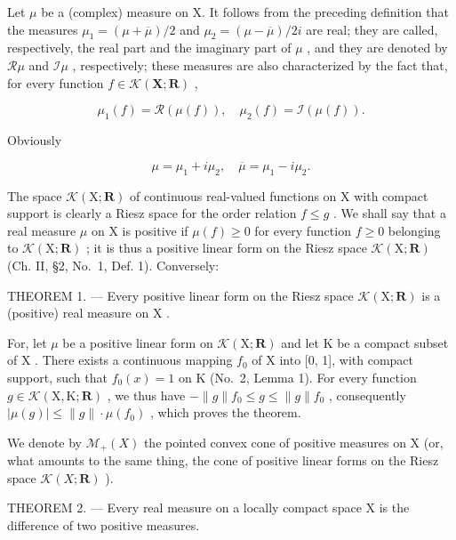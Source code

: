 Let \(\mu\) be a (complex) measure on X. It follows from the preceding definition that the measures \(\mu_{1} = (\mu +\overline{\mu}) / 2\) and \(\mu_{2} = (\mu -\overline{\mu}) / 2i\) are real; they are called, respectively, the real part and the imaginary part of \(\mu\) , and they are denoted by \(\mathcal{R}\mu\) and \(\mathcal{I}\mu\) , respectively; these measures are also characterized by the fact that, for every function \(f\in \mathcal{K}(\mathbf{X};\mathbf{R})\) ,

\[
\mu_ {1} (f) = \mathcal {R} (\mu (f)), \quad \mu_ {2} (f) = \mathcal {I} (\mu (f)).
\]

Obviously

\[
\mu = \mu_ {1} + i \mu_ {2}, \quad \overline {{{{\mu}}}} = \mu_ {1} - i \mu_ {2}.
\]

The space \(\mathcal{K}(\mathrm{X};\mathbf{R})\) of continuous real-valued functions on \(\mathrm{X}\) with compact support is clearly a Riesz space for the order relation \(f\leqslant g\) . We shall say that a real measure \(\mu\) on \(\mathrm{X}\) is positive if \(\mu (f)\geqslant 0\) for every function \(f\geqslant 0\) belonging to \(\mathcal{K}(\mathrm{X};\mathbf{R})\) ; it is thus a positive linear form on the Riesz space \(\mathcal{K}(\mathrm{X};\mathbf{R})\) (Ch. II, §2, No.~1, Def. 1). Conversely:

THEOREM 1. --- Every positive linear form on the Riesz space \(\mathcal{K}(\mathrm{X};\mathbf{R})\) is a (positive) real measure on \(\mathrm{X}\) .

For, let \(\mu\) be a positive linear form on \(\mathcal{K}(\mathrm{X};\mathbf{R})\) and let \(\mathrm{K}\) be a compact subset of \(\mathrm{X}\) . There exists a continuous mapping \(f_0\) of \(\mathrm{X}\) into {[}0, 1{]}, with compact support, such that \(f_0(x) = 1\) on \(\mathrm{K}\) (No.~2, Lemma 1). For every function \(g \in \mathcal{K}(\mathrm{X},\mathrm{K};\mathbf{R})\) , we thus have \(-\| g \| f_0 \leqslant g \leqslant \| g \| f_0\) , consequently \(|\mu(g)| \leqslant \| g \| \cdot \mu(f_0)\) , which proves the theorem.

We denote by \(\mathcal{M}_{+}(X)\) the pointed convex cone of positive measures on X (or, what amounts to the same thing, the cone of positive linear forms on the Riesz space \(\mathcal{K}(X;\mathbf{R})\) ).

THEOREM 2. --- Every real measure on a locally compact space X is the difference of two positive measures.


